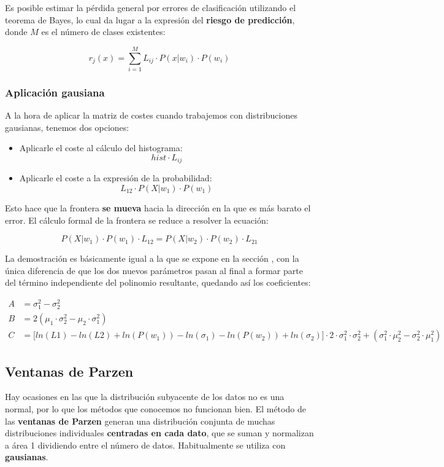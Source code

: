 \documentclass[11pt]{scrartcl}
\begin{document}
Es posible estimar la pérdida general por errores de clasificación utilizando el
teorema de Bayes, lo cual da lugar a la expresión del \textbf{riesgo de
  predicción}, donde $M$ es el número de clases existentes:

\[
r_j(x) = \sum_{i=1}^M L_{ij} \cdot P(x|w_i) \cdot P(w_i)
\]

\subsubsection{Aplicación gausiana}

A la hora de aplicar la matriz de costes cuando trabajemos con distribuciones
gausianas, tenemos dos opciones:

\begin{itemize}
\item Aplicarle el coste al cálculo del histograma: $$hist \cdot L_{ij}$$

\item Aplicarle el coste a la expresión de la probabilidad: 
\[
L_{12} \cdot P(X|w_1) \cdot P(w_1)
\]
\end{itemize}

Esto hace que la frontera \textbf{se mueva} hacia la dirección en la que es más
barato el error. El cálculo formal de la frontera se reduce a resolver la ecuación:

\[
P(X|w_1) \cdot P(w_1) \cdot L_{12} = P(X|w_2) \cdot P(w_2) \cdot L_{21}
\]

La demostración es básicamente igual a la que se expone en la sección
\textit{}, con la única diferencia de que los dos
nuevos parámetros pasan al final a formar parte del término independiente del
polinomio resultante, quedando así los coeficientes:

\begin{align*}
  A &= \sigma_1^2 - \sigma_2^2 \\
  B &= 2(\mu_1 \cdot \sigma_2^2 - \mu_2 \cdot \sigma_1^2) \\
  C &= \Big[ ln(L1) - ln(L2) +  ln(P(w_1)) - ln(\sigma_1) - ln(P(w_2)) + ln(\sigma_2) \Big] \cdot 2 \cdot \sigma_1^2 \cdot \sigma_2^2 + (\sigma_1^2 \cdot \mu_2^2 - \sigma_2^2 \cdot \mu_1^2)
\end{align*}

\subsection{Ventanas de Parzen}

Hay ocasiones en las que la distribución subyacente de los datos no es una
normal, por lo que los métodos que conocemos no funcionan bien. El método de las
\textbf{ventanas de Parzen} generan una distribución conjunta de muchas
distribuciones individuales \textbf{centradas en cada dato}, que se suman y
normalizan a área 1 dividiendo entre el número de datos. Habitualmente se
utiliza con \textbf{gausianas}.
\end{document}
